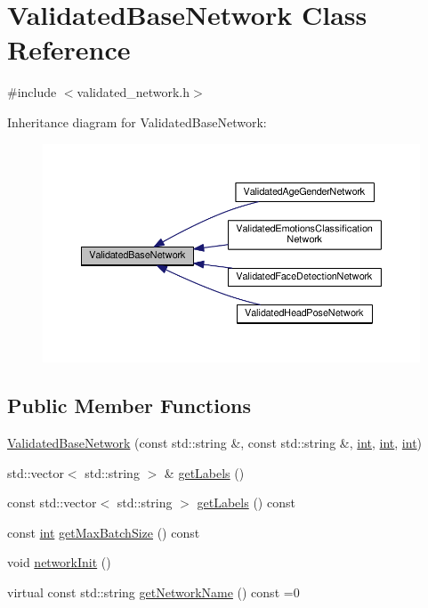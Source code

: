 \hypertarget{classValidatedBaseNetwork}{}\section{Validated\+Base\+Network Class Reference}
\label{classValidatedBaseNetwork}


{\ttfamily \#include $<$validated\+\_\+network.\+h$>$}



Inheritance diagram for Validated\+Base\+Network\+:
\nopagebreak
\begin{figure}[H]
\begin{center}
\leavevmode
\includegraphics[width=350pt]{classValidatedBaseNetwork__inherit__graph}
\end{center}
\end{figure}
\subsection*{Public Member Functions}
\begin{DoxyCompactItemize}
\item 
\hyperlink{classValidatedBaseNetwork_acd5df9d5e7e12a7c5d1952a0514e020c}{Validated\+Base\+Network} (const std\+::string \&, const std\+::string \&, \hyperlink{CMakeCache_8txt_a79a3d8790b2588b09777910863574e09}{int}, \hyperlink{CMakeCache_8txt_a79a3d8790b2588b09777910863574e09}{int}, \hyperlink{CMakeCache_8txt_a79a3d8790b2588b09777910863574e09}{int})
\item 
std\+::vector$<$ std\+::string $>$ \& \hyperlink{classValidatedBaseNetwork_a910ff44b8e6d9433e713131c59468900}{get\+Labels} ()
\item 
const std\+::vector$<$ std\+::string $>$ \hyperlink{classValidatedBaseNetwork_a2738e5ea649a8ff282cb411cebe0ea76}{get\+Labels} () const 
\item 
const \hyperlink{CMakeCache_8txt_a79a3d8790b2588b09777910863574e09}{int} \hyperlink{classValidatedBaseNetwork_a2cbce029c3eded2d7ed25a04a17f15d7}{get\+Max\+Batch\+Size} () const 
\item 
void \hyperlink{classValidatedBaseNetwork_aab380dc846bece3d102f2886eaf0c8ab}{network\+Init} ()
\item 
virtual const std\+::string \hyperlink{classValidatedBaseNetwork_ad2fdf0b3d87e530e699a6569236a2c8c}{get\+Network\+Name} () const =0
\end{DoxyCompactItemize}
